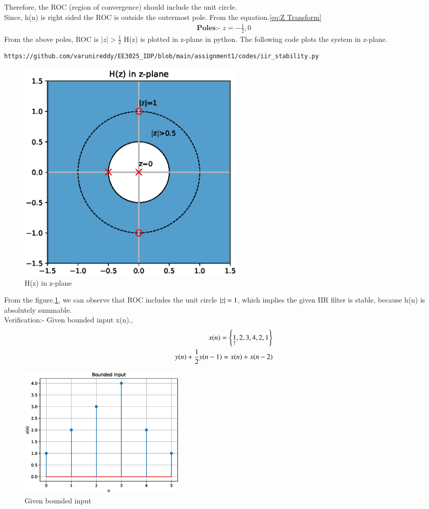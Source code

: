 \documentclass[journal,12pt,twocolumn]{IEEEtran}
\begin{document}
Therefore, the ROC (region of convergence) should include the unit circle.\\
Since, h(n) is right sided the ROC is outside the outermost pole.
From the equation.\ref{eq:Z Transform}
\begin{align}
    \textbf{Poles:- } z = -\frac{1}{2},0
\end{align}
From the above poles, ROC is $|z|>\frac{1}{2}$
H(z) is plotted in z-plane in python.
The following code plots the system in z-plane.
\begin{lstlisting}
https://github.com/varunireddy/EE3025_IDP/blob/main/assignment1/codes/iir_stability.py
\end{lstlisting}

\begin{figure}[h!]
    \centering
    \includegraphics[width=11cm]{./figs/z_plane.eps}
    \caption{H(z) in z-plane}
    \label{Z_plane analysis}
\end{figure}
From the figure.\ref{Z_plane analysis}, we can observe that ROC includes the unit circle $\left\vert z\right\vert = 1$, which implies the given IIR filter is stable, because h(n) is absolutely summable.\\
Verification:- Given bounded input x(n).,
\begin{align}
    x(n) = \left\{\underset{\uparrow}{1},2,3,4,2,1\right\}\\
    y(n)+\frac{1}{2}y(n-1) = x(n)+x(n-2)
\end{align}
\begin{figure}[h!]
    \centering
    \includegraphics[width=8cm]{./figs/x_n.eps}
    \caption{Given bounded input}
    \label{xn}
\end{figure}
\end{document}
